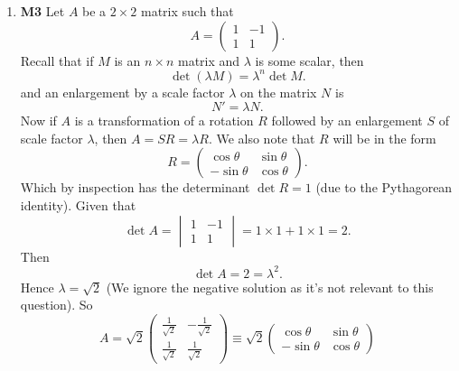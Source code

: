\documentclass[12pt,oneside]{book}
\begin{document}
\begin{enumerate}
        \begin{proof}
            Assume there exists two non-singular matrices $A$ and $B$ such that $AB = 0$. 
            It follows that if they are non-singular, then the matrices $A^{-1}$ and $B^{-1}$ exist such that \begin{align*}
                A^{-1} AB &= B \\
                AB B^{-1} &= A
            \end{align*}
            But $AB = 0$, and since $M \times 0 = 0$, then it follows that $A = B = 0$. A contradiction! 
            Thus proving the initial assumption that $A, B$ are non-singular is false. (\textit{I got bored...})
        \end{proof} 
        \item \textbf{M3} Let $A$ be a $2 \times 2$ matrix such that \[
            A = \begin{pmatrix} 1 & -1 \\ 1 & 1 \end{pmatrix}
        .\] Recall that if $M$ is an $n \times n$ matrix and $\lambda$ is some scalar, then \[
            \det(\lambda M) = \lambda^n \det M
        .\] and an enlargement by a scale factor $\lambda$ on the matrix $N$ is \[
            N' = \lambda N
        .\] Now if $A$ is a transformation of a rotation $R$ followed by an enlargement $S$ of scale factor $\lambda$, then $A = SR = \lambda R$. We also note that $R$ will be in the form \[
            R = \begin{pmatrix} \cos \theta & \sin \theta \\ - \sin \theta & \cos \theta \end{pmatrix}
        .\] Which by inspection has the determinant $\det R = 1$ (due to the Pythagorean identity). Given that \[
            \det A = \begin{vmatrix} 1 & -1 \\ 1 & 1 \end{vmatrix} = 1 \times 1 + 1 \times 1 = 2
        .\]  Then \[
            \det A = 2 = \lambda^2
        .\] Hence $\lambda =  \sqrt{2}$ (We ignore the negative solution as it's not relevant to this question). So \[
            A = \sqrt{2} \begin{pmatrix} \frac{1}{\sqrt{2}} & - \frac{1}{\sqrt{2}} \\  \frac{1}{\sqrt{2}} &  \frac{1}{\sqrt{2}} \end{pmatrix} \equiv  \sqrt{2} \begin{pmatrix} \cos \theta & \sin \theta \\ - \sin \theta & \cos \theta \end{pmatrix}
\]
\end{enumerate}
\end{document}
